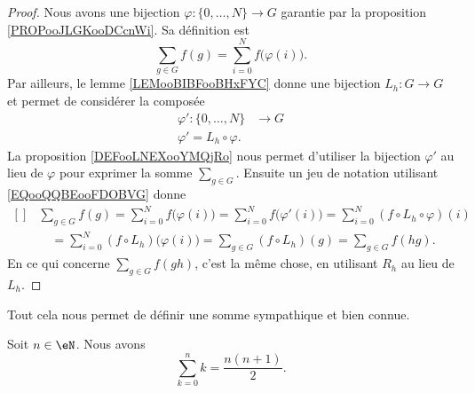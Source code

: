 \begin{proof}
    Nous avons une bijection \( \varphi\colon \{ 0,\ldots,  N \}\to G\) garantie par la proposition \ref{PROPooJLGKooDCcnWi}. Sa définition est
    \begin{equation}
        \sum_{g\in G}f(g)=\sum_{i=0}^Nf\big( \varphi(i) \big).
    \end{equation}
    Par ailleurs, le lemme \ref{LEMooBIBFooBHxFYC} donne une bijection \( L_h\colon G\to G\) et permet de considérer la composée
    \begin{equation}
        \begin{aligned}
            \varphi'\colon \{ 0,\ldots,  N \}&\to G \\
            \varphi'=L_h\circ \varphi.
        \end{aligned}
    \end{equation}
    La proposition \ref{DEFooLNEXooYMQjRo} nous permet d'utiliser la bijection \( \varphi'\) au lieu de \( \varphi\) pour exprimer la somme \( \sum_{g\in G}\). Ensuite un jeu de notation utilisant \eqref{EQooQQBEooFDOBVG} donne
    \begin{equation}
        \begin{aligned}[]
            &\sum_{g\in G}f(g)=\sum_{i=0}^Nf\big( \varphi(i) \big)=\sum_{i=0}^Nf\big( \varphi'(i) \big)=\sum_{i=0}^N(f\circ L_h\circ \varphi)(i)\\
            &\quad=\sum_{i=0}^N(f\circ L_h)\big( \varphi(i) \big)=\sum_{g\in G}(f\circ L_h)(g)=\sum_{g\in G}f(hg).
        \end{aligned}
    \end{equation}
    En ce qui concerne \( \sum_{g\in G}f(gh)\), c'est la même chose, en utilisant \( R_h\) au lieu de \( L_h\).
\end{proof}

Tout cela nous permet de définir une somme sympathique et bien connue.
\begin{lemma}
    Soit \( n\in \eN\). Nous avons
    \begin{equation}
        \sum_{k=0}^nk=\frac{ n(n+1) }{ 2 }.
    \end{equation}
\end{lemma}

